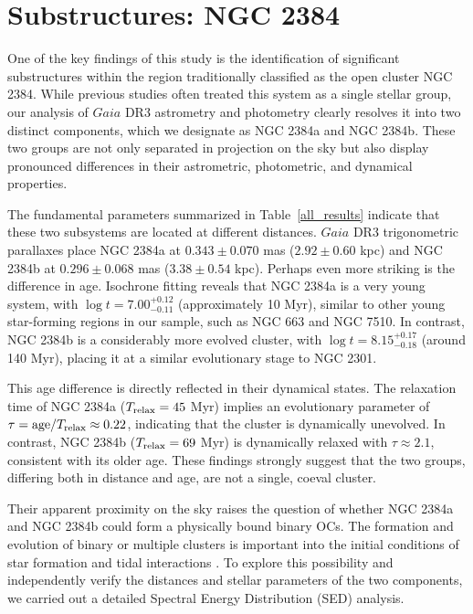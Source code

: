 \documentclass[referee]{raa}            %
\begin{document}
\section{Substructures: NGC 2384}
\label{sec:substructure}
One of the key findings of this study is the identification of significant substructures within the region traditionally classified as the open cluster NGC 2384. While previous studies often treated this system as a single stellar group, our analysis of $Gaia$ DR3 astrometry and photometry clearly resolves it into two distinct components, which we designate as NGC 2384a and NGC 2384b. These two groups are not only separated in projection on the sky but also display pronounced differences in their astrometric, photometric, and dynamical properties.

The fundamental parameters summarized in Table~\ref{all_results} indicate that these two subsystems are located at different distances. $Gaia$ DR3 trigonometric parallaxes place NGC 2384a at $0.343 \pm 0.070$ mas ($2.92 \pm 0.60$ kpc) and NGC 2384b at $0.296 \pm 0.068$ mas ($3.38 \pm 0.54$ kpc). Perhaps even more striking is the difference in age. Isochrone fitting reveals that NGC 2384a is a very young system, with $\log t = 7.00^{+0.12}_{-0.11}$ (approximately 10 Myr), similar to other young star-forming regions in our sample, such as NGC 663 and NGC 7510. In contrast, NGC 2384b is a considerably more evolved cluster, with $\log t = 8.15^{+0.17}_{-0.18}$ (around 140 Myr), placing it at a similar evolutionary stage to NGC 2301.

This age difference is directly reflected in their dynamical states. The relaxation time of NGC 2384a ($T_{\rm relax} = 45$ Myr) implies an evolutionary parameter of $\tau = \mathrm{age}/T_{\rm relax} \approx 0.22$, indicating that the cluster is dynamically unevolved. In contrast, NGC 2384b ($T_{\rm relax} = 69$ Myr) is dynamically relaxed with $\tau \approx 2.1$, consistent with its older age. These findings strongly suggest that the two groups, differing both in distance and age, are not a single, coeval cluster.

Their apparent proximity on the sky raises the question of whether NGC 2384a and NGC 2384b could form a physically bound binary OCs. The formation and evolution of binary or multiple clusters is important into the initial conditions of star formation and tidal interactions \citep[e.g.,][]{Delafauntemarcos2009, Palma2024}. To explore this possibility and independently verify the distances and stellar parameters of the two components, we carried out a detailed Spectral Energy Distribution (SED) analysis.
\end{document}
